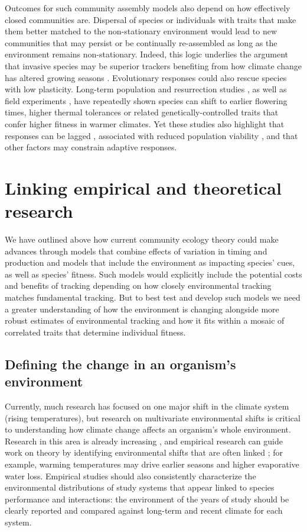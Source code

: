 \documentclass[11pt,letterpaper]{article}
\begin{document}
Outcomes for such community assembly models also depend on how effectively closed communities are. Dispersal of species or individuals with traits that make them better matched to the non-stationary environment would lead to new communities that may persist or be continually re-assembled as long as the environment remains non-stationary. Indeed, this logic underlies the argument that invasive species may be superior trackers benefiting from how climate change has altered growing seasons \citep{Willis:2010al,wolkovich:2010fee}. Evolutionary responses could also rescue species with low plasticity. Long-term population \citep[e.g.,][]{colautti2017} and resurrection studies \citep{wilczek2014,yousey2018}, as well as field experiments \citep{colautti2017,arab2019}, have repeatedly shown species can shift to earlier flowering times, higher thermal tolerances or related genetically-controlled traits that confer higher fitness in warmer climates. Yet these studies also highlight that responses can be lagged \citep[e.g.,][]{wilczek2014}, associated with reduced population viability \citep[e.g.,][]{colautti2017}, and that other factors may constrain adaptive responses.

\section{Linking empirical and theoretical research}
We have outlined above how  current community ecology theory could make advances through models that combine effects of variation in timing and production and models that include the environment as impacting species' cues, as well as species' fitness. Such models would explicitly include the potential costs and benefits of tracking  depending on how closely environmental tracking matches fundamental tracking. But to best test and develop such models we need a greater understanding of how the environment is changing alongside more robust estimates of environmental tracking and how it fits within a mosaic of correlated traits that determine individual fitness. 

\subsection{Defining the change in an organism's environment} 
Currently, much research has focused on one major shift in the climate system (rising temperatures), but research on multivariate environmental shifts is critical to understanding how climate change affects an organism's whole environment. Research in this area is already increasing \citep[e.g.,][]{chevin2015}, and empirical research can guide work on theory by identifying environmental shifts that are often linked \citep[e.g.,][]{wadgymar2018}; for example, warming temperatures may drive earlier seasons and higher evaporative water loss. Empirical studies should also consistently characterize the environmental distributions of study systems that appear linked to species performance and interactions: the environment of the years of study should be clearly reported and compared against long-term and recent climate for each system. 
\end{document}

